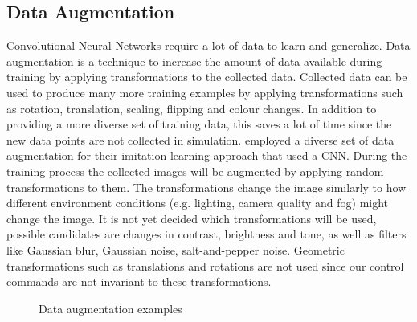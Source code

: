 
\subsection*{Data Augmentation}
Convolutional Neural Networks require a lot of data to learn and generalize. Data augmentation is a technique to increase the amount of data available during training by applying transformations to the collected data. Collected data can be used to produce many more training examples by applying transformations such as rotation, translation, scaling, flipping and colour changes. In addition to providing a more diverse set of training data, this saves a lot of time since the new data points are not collected in simulation. \autocite{conditional_imitation_learning} employed a diverse set of data augmentation for their imitation learning approach that used a CNN.
During the training process the collected images will be augmented by applying random transformations to them. The transformations change the image similarly to how different environment conditions (e.g. lighting, camera quality and fog) might change the image. It is not yet decided which transformations will be used, possible candidates are changes in contrast, brightness and tone, as well as filters like Gaussian blur, Gaussian noise, salt-and-pepper noise.
Geometric transformations such as translations and rotations are not used since our control commands are not invariant to these transformations.


\begin{figure}
     \centering
     \caption{Data augmentation examples}
     \label{fig:data_augmentation}
\end{figure}

